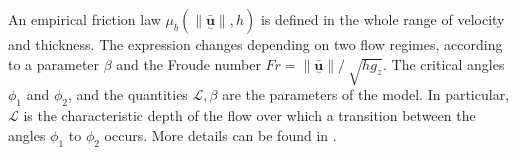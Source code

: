 \documentclass{article}
\begin{document}

An empirical friction law $\mu_{b}(\|\underset{^\sim}{\bar{\textbf{u}}} \| , h)$ is defined in the whole range of velocity and thickness. The expression changes depending on two flow regimes, according to a parameter $\beta$ and the Froude number $Fr=\| \underset{^\sim}{\bar{\textbf{u}}} \| / \ \sqrt{h g_{z}}$. The critical angles $\phi_{1}$ and $\phi_{2}$, and the quantities $\mathcal{L}, \beta$ are the parameters of the model. In particular, $\mathcal{L}$ is the characteristic depth of the flow over which a transition between the angles $\phi_{1}$ to $\phi_{2}$ occurs. More details can be found in \cite{Bevilacqua2019}. %


%
\end{document}

